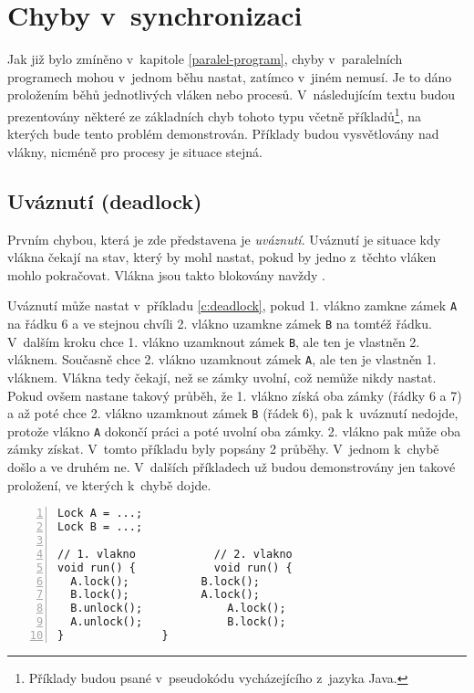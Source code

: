 \section{Chyby v~synchronizaci}\label{chyby}

Jak již bylo zmíněno v~kapitole \ref{paralel-program}, chyby v~paralelních programech mohou v~jednom běhu nastat, zatímco v~jiném nemusí. Je to dáno proložením běhů jednotlivých vláken nebo procesů. V~následujícím textu budou prezentovány některé ze základních chyb tohoto typu včetně příkladů\footnote{Příklady budou psané v~pseudokódu vycházejícího z~jazyka Java.}, na kterých bude tento problém demonstrován. Příklady budou vysvětlovány nad vlákny, nicméně pro procesy je situace stejná. 

\subsection{Uváznutí (deadlock)}

Prvním chybou, která je zde představena je \textit{uváznutí}. Uváznutí je situace kdy vlákna čekají na stav, který by mohl nastat, pokud by jedno z~těchto vláken mohlo pokračovat. Vlákna jsou takto blokovány navždy \cite{cite:OS1,cite:OS2}.

Uváznutí může nastat v~příkladu \ref{c:deadlock}, pokud 1. vlákno zamkne zámek \texttt{A} na řádku 6 a ve stejnou chvíli 2. vlákno uzamkne zámek \texttt{B} na tomtéž řádku. V~dalším kroku chce 1. vlákno uzamknout zámek \texttt{B}, ale ten je vlastněn 2. vláknem. Současně chce 2. vlákno uzamknout zámek \texttt{A}, ale ten je vlastněn 1. vláknem. Vlákna tedy čekají, než se zámky uvolní, což nemůže nikdy nastat. Pokud ovšem nastane takový průběh, že 1. vlákno získá oba zámky (řádky 6 a 7) a až poté chce 2. vlákno uzamknout zámek \texttt{B} (řádek 6), pak k~uváznutí nedojde, protože vlákno \texttt{A} dokončí práci a poté uvolní oba zámky. 2. vlákno pak může oba zámky získat. V~tomto příkladu byly popsány 2 průběhy. V~jednom k~chybě došlo a ve druhém ne. V~dalších příkladech už budou demonstrovány jen takové proložení, ve kterých k~chybě dojde. 

\begin{lstlisting}[caption=Pseudokód příkladu uváznutí dvou vláken., frame=none, label={c:deadlock}, numbers=left, xleftmargin=1cm]
Lock A = ...;
Lock B = ...;

// 1. vlakno			// 2. vlakno
void run() {			void run() {
  A.lock();			  B.lock();
  B.lock();			  A.lock();
  B.unlock();			  A.lock();
  A.unlock();			  B.lock();
}				}
\end{lstlisting}

